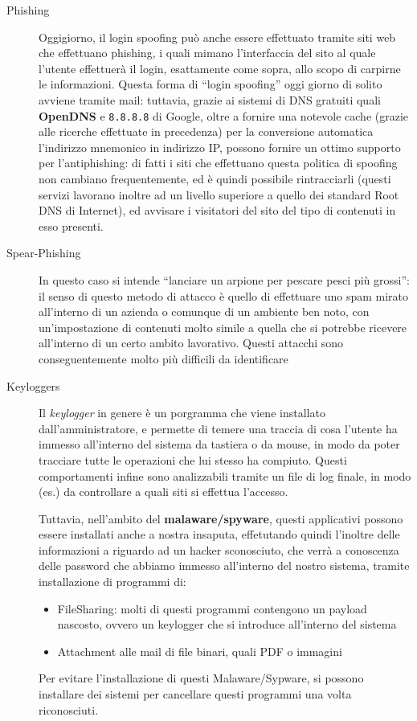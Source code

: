 \begin{description}
\item[Phishing] Oggigiorno, il login spoofing può anche essere effettuato tramite
	siti web che effettuano phishing, i quali mimano l'interfaccia del sito
	al quale l'utente effettuerà il login, esattamente come sopra, allo scopo
	di carpirne le informazioni. Questa forma di ``login spoofing'' oggi
	giorno di solito avviene tramite mail: tuttavia, grazie ai sistemi
	di DNS gratuiti quali \textbf{OpenDNS} e \texttt{8.8.8.8} di Google, oltre a 
	fornire una notevole cache (grazie alle ricerche effettuate in precedenza)
	per la conversione automatica l'indirizzo mnemonico in indirizzo IP,
	possono fornire un ottimo supporto per l'antiphishing: di fatti i siti
	che effettuano questa politica di spoofing non cambiano frequentemente,
	ed è quindi possibile rintracciarli (questi servizi lavorano inoltre
	ad un livello superiore a quello dei standard Root DNS di Internet), ed
	avvisare i visitatori del sito del tipo di contenuti in esso presenti.
	
\item[Spear-Phishing] In questo caso si intende ``lanciare un arpione per 
	pescare pesci più grossi'': il senso di questo metodo di attacco è quello
	di effettuare uno spam mirato all'interno di un azienda o comunque di
	un ambiente ben noto, con un'impostazione di contenuti molto simile
	a quella che si potrebbe ricevere all'interno di un certo ambito 
	lavorativo. Questi attacchi sono conseguentemente molto più difficili
	da identificare
\item[Keyloggers] Il \textit{keylogger} in genere è un porgramma che viene 
	installato dall'amministratore, e permette di temere una traccia di cosa 
	l'utente ha immesso all'interno del sistema da tastiera o da mouse,
	in modo da poter tracciare tutte le operazioni che lui stesso ha
	compiuto. Questi comportamenti infine sono analizzabili tramite un file
	di log finale, in modo (es.) da controllare a quali siti si effettua 
	l'accesso.
	
	Tuttavia, nell'ambito del \textbf{malaware/spyware}, questi applicativi
	possono essere installati anche a nostra insaputa, effetutando quindi
	l'inoltre delle informazioni a riguardo ad un hacker sconosciuto, che 
	verrà a conoscenza delle password che abbiamo immesso all'interno del
	nostro sistema, tramite installazione di programmi di:
	\begin{itemize}
	\item FileSharing: molti di questi programmi contengono un payload
		nascosto, ovvero un keylogger che si introduce all'interno del
		sistema
	\item Attachment alle mail di file binari, quali PDF o immagini
	\end{itemize}
	Per evitare l'installazione di questi Malaware/Sypware, si possono installare
	dei sistemi per cancellare questi programmi una volta riconosciuti.
	

\end{description}
